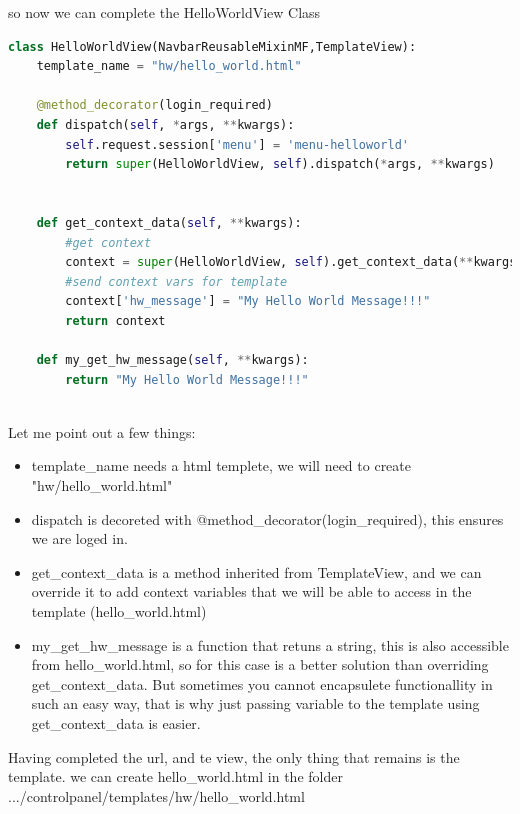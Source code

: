so now we can complete the HelloWorldView Class

\begin{lstlisting}[language=Python,firstnumber=1]
class HelloWorldView(NavbarReusableMixinMF,TemplateView):
	template_name = "hw/hello_world.html"

	@method_decorator(login_required)
	def dispatch(self, *args, **kwargs):
		self.request.session['menu'] = 'menu-helloworld'
		return super(HelloWorldView, self).dispatch(*args, **kwargs)


	def get_context_data(self, **kwargs):
		#get context
		context = super(HelloWorldView, self).get_context_data(**kwargs)
		#send context vars for template
		context['hw_message'] = "My Hello World Message!!!"
		return context
		
	def my_get_hw_message(self, **kwargs):
		return "My Hello World Message!!!"
		
\end{lstlisting}

Let me point out a few things:

\begin{itemize}
\item  template\_name needs a html templete, we will need to create "hw/hello\_world.html"
\item  dispatch is decoreted with @method\_decorator(login\_required), 
this ensures we are loged in.

\item  get\_context\_data is a method inherited from TemplateView, and we can override it to add context variables that we will be able to access in the template (hello\_world.html)

\item  my\_get\_hw\_message is a function that retuns a string, this is also accessible from hello\_world.html, so for this case is a better solution than overriding get\_context\_data.
But sometimes you cannot encapsulete functionallity in such an easy way, that is why just passing variable to the template using get\_context\_data is easier.

\end{itemize}


Having completed the url, and te view, the only thing that remains is the template.
we can create hello\_world.html in the folder .../controlpanel/templates/hw/hello\_world.html

